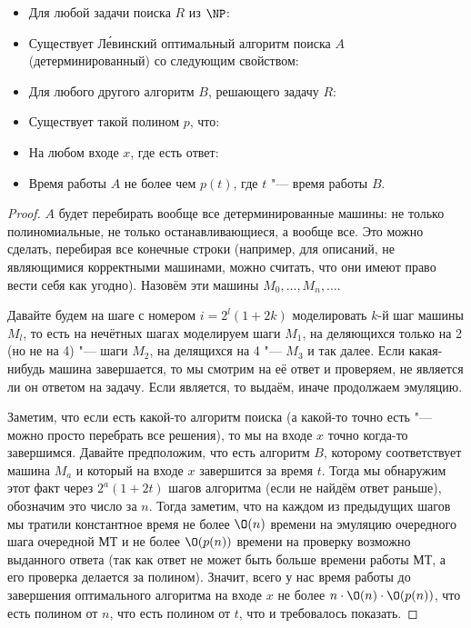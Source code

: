 	\begin{theorem}
		\begin{itemize}
			\item Для любой задачи поиска $R$ из $\NP$:
			\item Существует Л\'евинский оптимальный алгоритм поиска $A$ (детерминированный) со следующим свойством:
			\item Для любого другого алгоритм $B$, решающего задачу $R$:
			\item Существует такой полином $p$, что:
			\item На любом входе $x$, где есть ответ:
			\item Время работы $A$ не более чем $p(t)$, где $t$ "--- время работы $B$.
		\end{itemize}
	\end{theorem}
	\begin{proof}
		$A$ будет перебирать вообще все детерминированные машины: не только полиномиальные, не только останавливающиеся, а вообще все.
		Это можно сделать, перебирая все конечные строки (например, для описаний, не являющимися корректными машинами, можно считать, что они имеют право вести себя как угодно).
		Назовём эти машины $M_0, \dots, M_n, \dots$.

		Давайте будем на шаге с номером $i=2^l(1+2k)$ моделировать $k$-й шаг машины $M_l$, то есть на нечётных шагах моделируем шаги $M_1$,
		на деляющихся только на 2 (но не на 4) "--- шаги $M_2$, на делящихся на 4 "--- $M_3$ и так далее.
		Если какая-нибудь машина завершается, то мы смотрим на её ответ и проверяем, не является ли он ответом на задачу.
		Если является, то выдаём, иначе продолжаем эмуляцию.

		Заметим, что если есть какой-то алгоритм поиска (а какой-то точно есть "--- можно просто перебрать все решения), то мы на входе $x$ точно когда-то завершимся.
		Давайте предположим, что есть алгоритм $B$, которому соответствует машина $M_a$ и который на входе $x$ завершится за время $t$.
		Тогда мы обнаружим этот факт через $2^a(1+2t)$ шагов алгоритма (если не найдём ответ раньше), обозначим это число за $n$.
		Тогда заметим, что на каждом из предыдущих шагов мы тратили константное время не более $\O(n)$ времени на эмуляцию очередного шага очередной МТ
		и не более $\O(p(n))$ времени на проверку возможно выданного ответа (так как ответ не может быть больше времени работы МТ, а его проверка делается за полином).
		Значит, всего у нас время работы до завершения оптимального алгоритма на входе $x$ не более $n \cdot \O(n) \cdot \O(p(n))$, что есть полином от $n$, что есть
		полином от $t$, что и требовалось показать.
	\end{proof}
